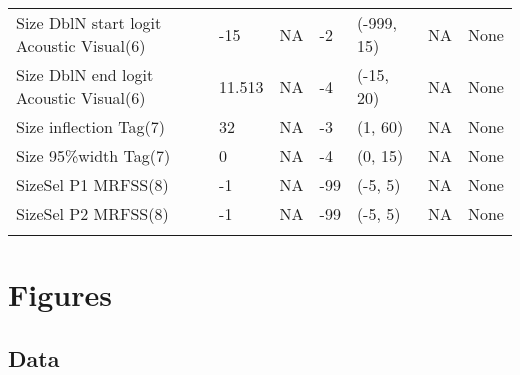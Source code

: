 \documentclass[11pt,
  english,
  letterpaper,
]{article}
\begin{document}
\begin{landscape}
\begin{longtable}[t]{>{\raggedright\arraybackslash}p{7.5cm}lllll>{\raggedright\arraybackslash}p{3.5cm}}
Size DblN start logit Acoustic Visual(6) & -15 & NA & -2 & (-999, 15) & NA & None\\
Size DblN end logit Acoustic Visual(6) & 11.513 & NA & -4 & (-15, 20) & NA & None\\
Size inflection Tag(7) & 32 & NA & -3 & (1, 60) & NA & None\\
Size 95\%width Tag(7) & 0 & NA & -4 & (0, 15) & NA & None\\
SizeSel P1 MRFSS(8) & -1 & NA & -99 & (-5, 5) & NA & None\\
SizeSel P2 MRFSS(8) & -1 & NA & -99 & (-5, 5) & NA & None\\*
\end{longtable}
\endgroup{}
\end{landscape}
\endgroup{}

\newpage





\newpage



\newpage



\newpage













\newpage



\clearpage

\clearpage


\hypertarget{figures}{%
\section{Figures}\label{figures}}

\hypertarget{data}{%
\subsection{Data}\label{data}}
\end{document}
